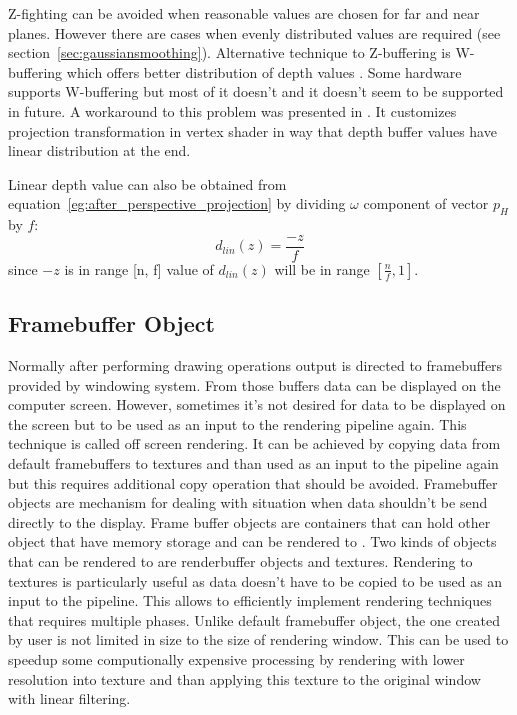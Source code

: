Z-fighting can be avoided when reasonable values are chosen for far and near planes. However there are cases when evenly distributed values are required (see section~\ref{sec:gaussiansmoothing}). Alternative technique to Z-buffering is W-buffering which offers better distribution of depth values \cite{Gregory2009}. Some hardware supports W-buffering but most of it doesn't and it doesn't seem to be supported in future. A workaround to this problem was presented in \cite{Dunlop2006}. It customizes projection transformation in vertex shader in way that depth buffer values have linear distribution at the end. 

Linear depth value can also be obtained from equation~\ref{eg:after_perspective_projection} by dividing $\omega$ component of vector $p_H$ by $f$:
\begin{equation}
\label{eq:linear_depth}
d_{lin}(z) = \frac{-z}{f}
\end{equation}
since $-z$ is in range [n, f] value of $d_{lin}(z)$ will be in range $[\frac{n}{f}, 1]$. 


\subsection{Framebuffer Object}
Normally after performing drawing operations output is directed to framebuffers provided by windowing system. From those buffers data can be displayed on the computer screen. However, sometimes it's not desired for data to be displayed on the screen but to be used as an input to the rendering pipeline again. This technique is called off screen rendering. It can be achieved by copying data from default framebuffers to textures and than used as an input to the pipeline again but this requires additional copy operation that should be avoided. Framebuffer objects are mechanism for dealing with situation when data shouldn't be send directly to the display. Frame buffer objects are containers that can hold other object that have memory storage and can be rendered to \cite[chapter~8]{OpenGLSuperbible}. Two kinds of objects that can be rendered to are renderbuffer objects and textures. Rendering to textures is particularly useful as data doesn't have to be copied to be used as an input to the pipeline. This allows to efficiently implement rendering techniques that requires multiple phases.
Unlike default framebuffer object, the one created by user is not limited in size to the size of rendering window. This can be used to speedup some computionally expensive processing by rendering with lower resolution into texture and than applying this texture to the original window with linear filtering. 

